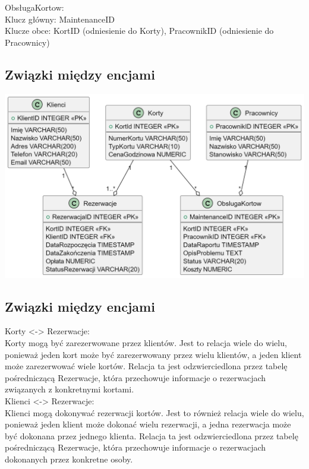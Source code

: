 \documentclass{article}
\begin{document}
\noindent
ObsługaKortow:\\
Klucz główny: MaintenanceID\\
Klucze obce: KortID (odniesienie do Korty), PracownikID (odniesienie do Pracownicy)\\

\subsection*{Związki między encjami}
\includegraphics[trim=0 0 0 0,clip,width=\linewidth]{diagram.png}

\subsection*{Związki między encjami}

\noindent
Korty <-> Rezerwacje:\\
Korty mogą być zarezerwowane przez klientów. Jest to relacja wiele do wielu, ponieważ jeden kort może być zarezerwowany przez wielu klientów, a jeden klient może zarezerwować wiele kortów. Relacja ta jest odzwierciedlona przez tabelę pośredniczącą Rezerwacje, która przechowuje informacje o rezerwacjach związanych z konkretnymi kortami.\\

\noindent
Klienci <-> Rezerwacje:\\
Klienci mogą dokonywać rezerwacji kortów. Jest to również relacja wiele do wielu, ponieważ jeden klient może dokonać wielu rezerwacji, a jedna rezerwacja może być dokonana przez jednego klienta. Relacja ta jest odzwierciedlona przez tabelę pośredniczącą Rezerwacje, która przechowuje informacje o rezerwacjach dokonanych przez konkretne osoby.\\
\end{document}
